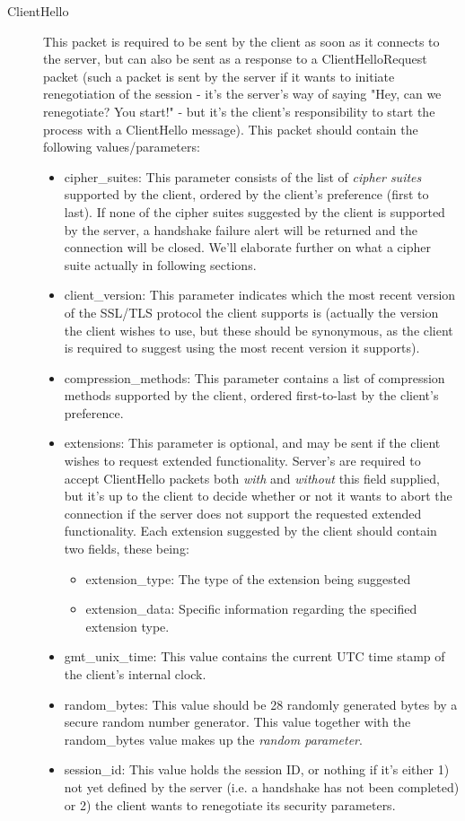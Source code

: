 \begin{description}
	\item[ClientHello] This packet is required to be sent by the client as soon as it connects to the server, but can also be sent as a response to a ClientHelloRequest packet (such a packet is sent by the server if it wants to initiate renegotiation of the session - it's the server's way of saying "Hey, can we renegotiate? You start!" - but it's the client's responsibility to start the process with a ClientHello message). This packet should contain the following values/parameters:
	\begin{itemize}
		\item cipher\_suites: This parameter consists of the list of \textit{cipher suites} supported by the client, ordered by the client's preference (first to last). If none of the cipher suites suggested by the client is supported by the server, a handshake failure alert will be returned and the connection will be closed. We'll elaborate further on what a cipher suite actually in following sections.
		\item client\_version: This parameter indicates which the most recent version of the SSL/TLS protocol the client supports is (actually the version the client wishes to use, but these should be synonymous, as the client is required to suggest using the most recent version it supports).
		\item compression\_methods: This parameter contains a list of compression methods supported by the client, ordered first-to-last by the client's preference.
		\item extensions: This parameter is optional, and may be sent if the client wishes to request extended functionality. Server's are required to accept ClientHello packets both \textit{with} and \textit{without} this field supplied, but it's up to the client to decide whether or not it wants to abort the connection if the server does not support the requested extended functionality. Each extension suggested by the client should contain two fields, these being:
		\begin{itemize}
			\item extension\_type: The type of the extension being suggested
			\item extension\_data: Specific information regarding the specified extension type.
		\end{itemize}
		\item gmt\_unix\_time: This value contains the current UTC time stamp of the client's internal clock.
		\item random\_bytes: This value should be 28 randomly generated bytes by a secure random number generator. This value together with the random\_bytes value makes up the \textit{random parameter}.
		\item session\_id: This value holds the session ID, or nothing if it's either 1) not yet defined by the server (i.e. a handshake has not been completed) or 2) the client wants to renegotiate its security parameters.
	\end{itemize}
	

\end{description}
